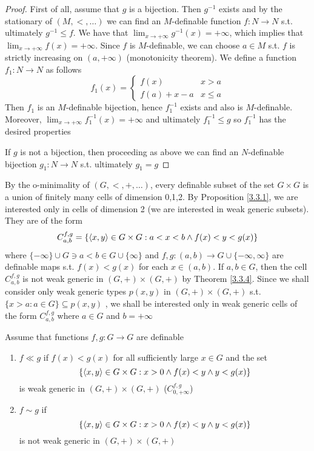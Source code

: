 \documentclass[11pt]{article}
\begin{document}
\begin{proof}
First of all, assume that \(g\) is a bijection. Then \(g^{-1}\) exists and by the stationary
of \((M,<,\dots)\) we can find an \(M\)-definable function \(f:N\to N\) s.t. ultimately \(g^{-1}\le f\).
We have that \(\lim_{x\to+\infty}g^{-1}(x)=+\infty\), which implies that \(\lim_{x\to+\infty}f(x)=+\infty\). Since \(f\)
is \(M\)-definable, we can choose \(a\in M\) s.t. \(f\) is strictly increasing on \((a,+\infty)\)
(monotonicity theorem). We define a function \(f_1:N\to N\) as follows
\begin{equation*}
f_1(x)=
\begin{cases}
f(x)&x>a\\
f(a)+x-a&x\le a
\end{cases}
\end{equation*}
Then \(f_1\) is an \(M\)-definable bijection, hence \(f_1^{-1}\) exists and also
is \(M\)-definable. Moreover, \(\lim_{x\to+\infty}f_1^{-1}(x)=+\infty\) and ultimately \(f^{-1}_1\le g\)
so \(f_1^{-1}\) has the desired properties

If \(g\) is not a bijection, then proceeding as above we can find an \(N\)-definable
bijection \(g_1:N\to N\) s.t. ultimately \(g_1=g\)
\end{proof}

By the o-minimality of \((G,<,+,\dots)\), every definable subset of the set \(G\times G\) is a union of
finitely many cells of dimension 0,1,2. By Proposition \ref{3.3.1}, we are interested only in
cells of dimension 2 (we are interested in weak generic subsets). They are of the form
\begin{equation*}
C_{a,b}^{f,g}=\{\langle x,y\rangle\in G\times G:a<x<b\wedge f(x)<y<g(x)\}
\end{equation*}
where \(\{-\infty\}\cup G\ni a<b\in G\cup\{\infty\}\) and \(f,g:(a,b)\to G\cup\{-\infty,\infty\}\) are definable maps s.t. \(f(x)<g(x)\)
for each \(x\in(a,b)\). If \(a,b\in G\), then the cell \(C_{a,b}^{f,g}\) is not weak generic
in \((G,+)\times(G,+)\) by Theorem \ref{3.3.4}. Since we shall consider only weak generic
types \(p(x,y)\) in \((G,+)\times (G,+)\) s.t. \(\{x>a:a\in G\}\subseteq p(x,y)\) \label{Problem3}, we shall be interested only in
weak generic cells of the form \(C_{a,b}^{f,g}\) where \(a\in G\) and \(b=+\infty\)

\begin{definition}[]
Assume that functions \(f,g:G\to G\) are definable
\begin{enumerate}
\item \(f\ll g\) if \(f(x)<g(x)\) for all sufficiently large \(x\in G\) and the set
\begin{equation*}
\{\langle x,y\rangle\in G\times G:x>0\wedge f(x)<y\wedge y<g(x)\}
\end{equation*}
is weak generic in \((G,+)\times (G,+)\) (\(C_{0,+\infty}^{f,g}\))
\item \(f\sim g\) if
\begin{equation*}
\{\langle x,y\rangle\in G\times G:x>0\wedge f(x)<y\wedge y<g(x)\}
\end{equation*}
is not weak generic in \((G,+)\times (G,+)\)
\end{enumerate}
\end{definition}
\end{document}
